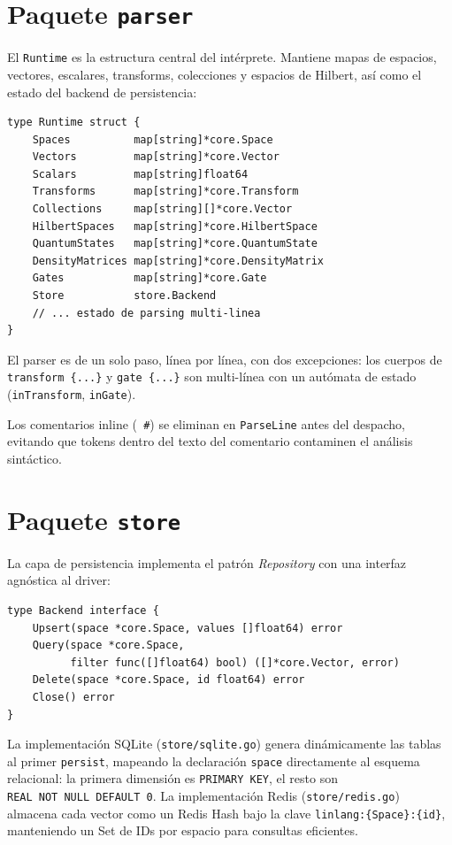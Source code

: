 \documentclass[12pt, a4paper, openany]{report}
\theoremstyle{definition}
\begin{document}
\section{Paquete \texttt{parser}}

El \texttt{Runtime} es la estructura central del intérprete. Mantiene mapas de espacios, vectores, escalares, transforms, colecciones y espacios de Hilbert, así como el estado del backend de persistencia:

\begin{lstlisting}[style=go, caption={Campos del Runtime}]
type Runtime struct {
    Spaces          map[string]*core.Space
    Vectors         map[string]*core.Vector
    Scalars         map[string]float64
    Transforms      map[string]*core.Transform
    Collections     map[string][]*core.Vector
    HilbertSpaces   map[string]*core.HilbertSpace
    QuantumStates   map[string]*core.QuantumState
    DensityMatrices map[string]*core.DensityMatrix
    Gates           map[string]*core.Gate
    Store           store.Backend
    // ... estado de parsing multi-linea
}
\end{lstlisting}

El parser es de un solo paso, línea por línea, con dos excepciones: los cuerpos de \texttt{transform~\{...\}} y \texttt{gate~\{...\}} son multi-línea con un autómata de estado (\texttt{inTransform}, \texttt{inGate}).

Los comentarios inline (\texttt{ \#}) se eliminan en \texttt{ParseLine} antes del despacho, evitando que tokens dentro del texto del comentario contaminen el análisis sintáctico.

\section{Paquete \texttt{store}}

La capa de persistencia implementa el patrón \emph{Repository} con una interfaz agnóstica al driver:

\begin{lstlisting}[style=go, caption={Interfaz Backend}]
type Backend interface {
    Upsert(space *core.Space, values []float64) error
    Query(space *core.Space,
          filter func([]float64) bool) ([]*core.Vector, error)
    Delete(space *core.Space, id float64) error
    Close() error
}
\end{lstlisting}

La implementación SQLite (\texttt{store/sqlite.go}) genera dinámicamente las tablas al primer \texttt{persist}, mapeando la declaración \texttt{space} directamente al esquema relacional: la primera dimensión es \texttt{PRIMARY~KEY}, el resto son \texttt{REAL~NOT~NULL~DEFAULT~0}. La implementación Redis (\texttt{store/redis.go}) almacena cada vector como un Redis Hash bajo la clave \texttt{linlang:\{Space\}:\{id\}}, manteniendo un Set de IDs por espacio para consultas eficientes.
\end{document}
